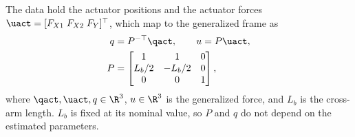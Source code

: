 The data hold the actuator positions and the actuator forces
$\uact=[F_{X1}\;F_{X2}\;F_Y]^\top$, which map to the generalized frame as
\begin{equation}
\begin{aligned}
  q &= P^{-\top}\qact,\qquad u = P\uact,\\
  P &=
  \begin{bmatrix}
    1 & 1 & 0\\
    L_b/2 & -L_b/2 & 0\\
    0 & 0 & 1
  \end{bmatrix},
\end{aligned}
  \label{eq:Ptransform}
\end{equation}
where $\qact,\uact,q\in\R^3$, $u\in\R^3$ is the generalized force, and
$L_b$ is the cross-arm length.
$L_b$ is fixed at its nominal value, so $P$ and $q$ do not depend on the
estimated parameters.

